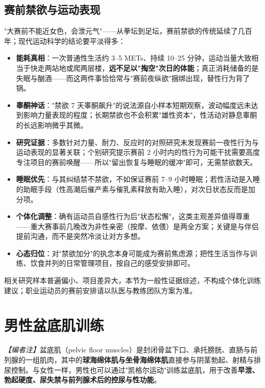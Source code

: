 \subsection{赛前禁欲与运动表现}

"大赛前不能近女色，会泄元气"——从拳坛到足坛，赛前禁欲的传统延续了几百年；现代运动科学的结论要平淡得多：

\begin{itemize}[leftmargin=2cm]
	\item \textbf{能耗真相}：一次普通性生活约 3--5 METs、持续 10--25 分钟，运动当量大致相当于快走两站地或爬两层楼，\textbf{远不足以"掏空"次日的体能}；真正消耗储备的是失眠与酗酒——而这两件事恰恰常与"赛前夜纵欲"捆绑出现，替性行为背了锅。
	\item \textbf{睾酮神话}："禁欲 7 天睾酮飙升"的说法源自小样本短期观察，波动幅度远未达到影响力量表现的程度；长期禁欲也不会积累"雄性资本"，性活动对静息睾酮的长远影响微乎其微。
	\item \textbf{研究证据}：多数针对力量、耐力、反应时的对照研究未发现赛前一夜性行为与运动表现的显著关联；个别研究提示赛前 2 小时内的性行为可能干扰需要高度专注项目的赛前唤醒——所以"留出恢复与睡眠的缓冲"即可，无需禁欲数天。
	\item \textbf{睡眠优先}：与其纠结禁不禁欲，不如保证赛前 7--9 小时睡眠；若性活动是入睡的助眠手段（性高潮后催产素与催乳素释放有助入睡），对次日状态反而是加分项。
	\item \textbf{个体化调整}：确有运动员自感性行为后"状态松懈"，这类主观差异值得尊重——重大赛事前几晚改为非性亲密（按摩、依偎）是两全方案；关键是与伴侣提前沟通，而不是突然冷淡让对方多想。
	\item \textbf{心态归位}：对"禁欲加分"的执念本身可能成为赛前焦虑源；把性生活当作与训练、饮食并列的日常管理项目，按自己的感受安排即可。
\end{itemize}

\begin{tcolorbox}[colback=pink!5!white,colframe=red!50!black,title=贴心小叮咛]
相关研究样本普遍偏小、项目差异大，本节为一般性证据综述，不构成个体化训练建议；职业运动员的赛前安排请以队医与教练团队方案为准。
\end{tcolorbox}

\section{男性盆底肌训练}

\noindent\textit{【编者注】}盆底肌（pelvic floor muscles）是封闭骨盆下口、承托膀胱、直肠与前列腺的一组肌肉，其中的\textbf{球海绵体肌与坐骨海绵体肌}直接参与阴茎勃起、射精与排尿控制。与女性一样，男性也可以通过"凯格尔运动"训练盆底肌，用于改善\textbf{早泄、勃起硬度、尿失禁与前列腺术后的控尿与性功能}。

